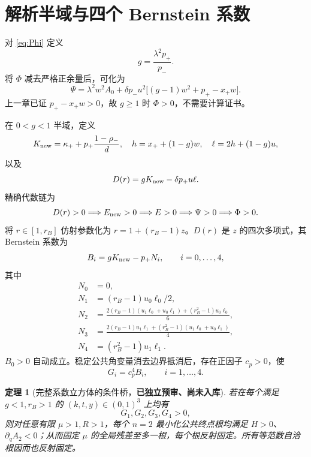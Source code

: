 \documentclass[UTF8,12pt,openany,fontset=fandol]{ctexrep}
\newtheorem{theorem}{定理}[chapter]
\theoremstyle{definition}
\newcommand{\Reviewed}{\textcolor{blue!65!black}{\textbf{已独立预审、尚未入库}}}
\begin{document}
\section{解析半域与四个 Bernstein 系数}

对 \eqref{eq:Phi} 定义
\begin{equation}
 g=\frac{\lambda^2p_+}{p_-}.
\end{equation}
将 $\Phi$ 减去严格正余量后，可化为
\begin{equation}
 \Psi=\lambda^2w^2A_0+\delta p_-u^2\bigl[(g-1)w^2+p_+-x_+w\bigr].
\end{equation}
上一章已证 $p_+-x_+w>0$，故 $g\ge1$ 时 $\Phi>0$，不需要计算证书。

在 $0<g<1$ 半域，定义
\begin{equation}
 K_{\rm new}=\kappa_++p_+\frac{1-\rho_-}{d},\quad
 h=x_++(1-g)w,\quad \ell=2h+(1-g)u,
\end{equation}
以及
\begin{equation}
 D(r)=gK_{\rm new}-\delta p_+u\ell.
\end{equation}
精确代数链为
\begin{equation}
 D(r)>0\Longrightarrow E_{\rm new}>0\Longrightarrow E>0
 \Longrightarrow\Psi>0\Longrightarrow\Phi>0.
\end{equation}
将 $r\in[1,r_B]$ 仿射参数化为 $r=1+(r_B-1)z$。$D(r)$ 是 $z$ 的四次多项式，其 Bernstein 系数为
\begin{equation}
 B_i=gK_{\rm new}-p_+N_i,\qquad i=0,\ldots,4,
\end{equation}
其中
\begin{align*}
 N_0&=0,\\
 N_1&=(r_B-1)u_0\ell_0/2,\\
 N_2&=\frac{2(r_B-1)(u_1\ell_0+u_0\ell_1)+(r_B^2-1)u_0\ell_0}{6},\\
 N_3&=\frac{2(r_B-1)u_1\ell_1+(r_B^2-1)(u_1\ell_0+u_0\ell_1)}4,\\
 N_4&=(r_B^2-1)u_1\ell_1.
\end{align*}
$B_0>0$ 自动成立。稳定公共角变量消去边界抵消后，存在正因子 $c_p>0$，使
\begin{equation}\label{eq:GtoB}
 G_i=c_p^4B_i,\qquad i=1,\ldots,4.
\end{equation}

\begin{theorem}[完整系数立方体的条件桥，\Reviewed]\label{thm:conditionalcube}
若在每个满足 $g<1,r_B>1$ 的 $(k,t,y)\in(0,1)^3$ 上均有
\begin{equation}
 G_1,G_2,G_3,G_4>0,
\end{equation}
则对任意有限 $\mu>1,R>1$，每个 $n=2$ 最小化公共终点根均满足 $H>0$、$\partial_qA_2<0$；从而固定 $\mu$ 的全局残差至多一根，每个根反射固定。所有等范数自洽根因而也反射固定。
\end{theorem}
\end{document}

